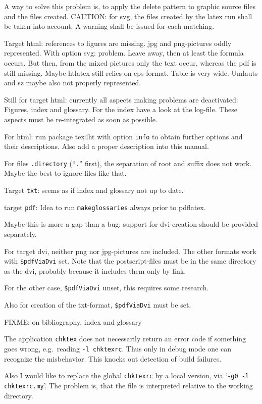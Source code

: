 \documentclass[12pt]{book}
\begin{document}
A way to solve this problem is, 
to apply the delete pattern to graphic source files 
and the files created. 
CAUTION\@: for svg, 
the files created by the latex run shall be taken into account. 
A warning shall be issued for each matching. 


Target html: references to figures are missing. 
jpg and png-pictures oddly represented. 
With option svg: problem. 
Leave away, then at least the formula occurs. 
But then, from the mixed pictures only the text occur, 
whereas the pdf is still missing. 
Maybe htlatex still relies on eps-format. 
Table is very wide. 
Umlauts and sz maybe also not properly represented. 

Still for target html: currently all aspects making problems 
are deactivated: 
Figures, index and glossary. 
For the index have a look at the log-file. 
These aspects must be re-integrated as soon as possible. 

For html: run package tex4ht with option \texttt{info} 
to obtain further options and their descriptions. 
Also add a proper description into this manual. 

For files \texttt{.directory} (``\texttt{.}'' first), 
the separation of root and suffix does not work. 
Maybe the best to ignore files like that. 

Target \texttt{txt}: seems as if index and glossary not up to date. 

target \texttt{pdf}: Idea to run \texttt{makeglossaries} 
always prior to pdflatex. 

Maybe this is more a gap than a bug: 
support for dvi-creation should be provided separately. 

For target dvi, 
neither png nor jpg-pictures are included. 
The other formats work with \texttt{\$pdfViaDvi} set. 
Note that the postscript-files must be in the same directory 
as the dvi, probably because it includes them 
only by link. 

For the other case, \texttt{\$pdfViaDvi} unset, this requires some research. 

Also for creation of the txt-format, 
\texttt{\$pdfViaDvi} must be set. 

FIXME\@: on bibliography, index and glossary 

The application \texttt{chktex} does not necessarily return an error code 
if something goes wrong, e.g.~reading \texttt{-l chktexrc}. 
Thus only in debug mode one can recognize the misbehavior. 
This knocks out detection of build failures. 

Also I would like to replace the global \texttt{chktexrc} by a local version, 
via `\texttt{-g0 -l chktexrc.my}'. 
The problem is, 
that the file is interpreted relative to the working directory. 
\end{document}
